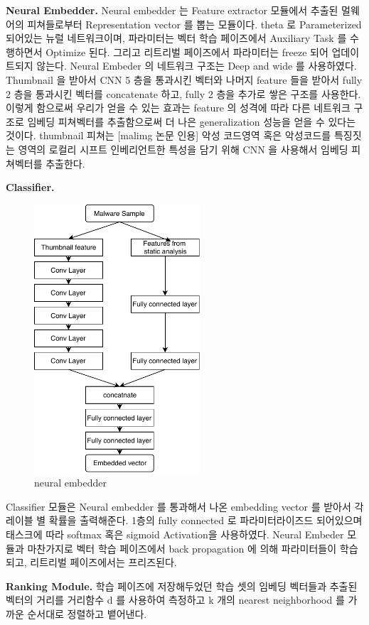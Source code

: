 \textbf{Neural Embedder. }
Neural embedder 는 Feature extractor 모듈에서 추출된 멀웨어의 피쳐들로부터 Representation vector 를 뽑는 모듈이다. theta 로 Parameterized 되어있는 뉴럴 네트워크이며, 파라미터는 벡터 학습 페이즈에서 Auxiliary Task 를 수행하면서 Optimize 된다. 그리고 리트리벌 페이즈에서 파라미터는 freeze 되어 업데이트되지 않는다. 
Neural Embeder 의 네트워크 구조는 Deep and wide 를 사용하였다. Thumbnail 을 받아서 CNN 5 층을 통과시킨 벡터와 나머지 feature 들을 받아서 fully 2 층을 통과시킨 벡터를 concatenate 하고, fully 2 층을 추가로 쌓은 구조를 사용한다. 이렇게 함으로써 우리가 얻을 수 있는 효과는 feature 의 성격에 따라 다른 네트워크 구조로 임베딩 피쳐벡터를 추출함으로써 더 나은 generalization 성능을 얻을 수 있다는 것이다. thumbnail 피쳐는 [malimg 논문 인용] 악성 코드영역 혹은 악성코드를 특징짓는 영역의 로컬리 시프트 인베리언트한 특성을 담기 위해 CNN 을 사용해서 임베딩 피쳐벡터를 추출한다. 


\textbf{Classifier. }
\begin{figure}
  \includegraphics[height=10cm]{../figures/neural_embedder.pdf}
  \caption{neural embedder}
  \label{fig:three}
\end{figure}
Classifier 모듈은 Neural embedder 를 통과해서 나온 embedding vector 를 받아서 각 레이블 별 확률을 출력해준다. 1층의 fully connected 로 파라미터라이즈드 되어있으며 태스크에 따라 softmax 혹은 sigmoid Activation을 사용하였다. Neural Embeder 모듈과 마찬가지로 벡터 학습 페이즈에서 back propagation 에 의해 파라미터들이 학습되고, 리트리벌 페이즈에서는 프리즈된다. 


\textbf{Ranking Module. }
학습 페이즈에 저장해두었던 학습 셋의 임베딩 벡터들과 추출된 벡터의 거리를 거리함수 d 를 사용하여 측정하고 k 개의 nearest neighborhood 를 가까운 순서대로 정렬하고 뱉어낸다.


